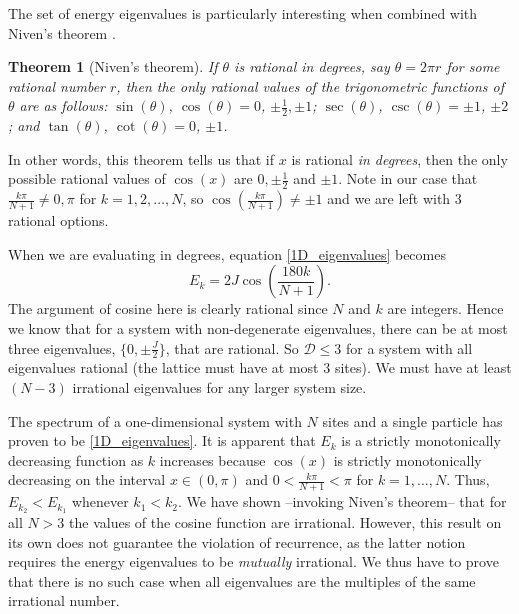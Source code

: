 \documentclass[prb, twocolumn, final]{revtex4-1}
\theoremstyle{plain}
\newtheorem*{theorem*}{Theorem}
\begin{document}
The set of energy eigenvalues is particularly interesting when combined with
Niven's theorem \cite{DoubleIvan}.

\begin{theorem*}[Niven's theorem]
    If $\theta$ is rational in degrees, say $\theta=2\pi r$ for some rational
    number $r$, then the only rational values of the trigonometric functions of
    $\theta$ are as follows: $\sin{\!(\theta)}$, $\cos{\!(\theta)} = 0$, $\pm
    \frac{1}{2}, \pm 1$; $\sec{\!(\theta)}$, $\csc{\!(\theta)} = \pm 1$, $\pm 2$;
    and $\tan{\!(\theta)}$, $\cot{\!(\theta)} = 0$, $\pm 1$.
\end{theorem*}
In other words, this theorem tells us that if $x$ is rational \textit{in
degrees}, then the only possible rational values of $\cos(x)$ are $0, \pm
\frac{1}{2}$ and $\pm 1$. Note in our case that $\frac{k\pi}{N+1}\neq 0, \pi$
for $k=1, 2, \dots, N$, so $\cos{\!(\frac{k\pi}{N+1})} \neq \pm 1$ and we are
left with $3$ rational options.

When we are evaluating in degrees, equation \eqref{1D_eigenvalues} becomes
\begin{equation}
    E_{k} = 2 J \cos{\!\left ( \frac{180k}{N+1} \right )}.
\end{equation}
The argument of cosine here is clearly rational since $N$ and $k$ are integers.
Hence we know that for a system with non-degenerate eigenvalues, there can be at
most three eigenvalues, $\lbrace 0, \pm \frac{J}{2} \rbrace$, that are rational.
So $\mathcal{D} \leq 3$ for a system with all eigenvalues rational (the lattice
must have at most 3 sites). We must have at least $(N-3)$ irrational eigenvalues
for any larger system size.

The spectrum of a one-dimensional system with $N$ sites and a single particle
has proven to be \eqref{1D_eigenvalues}. It is apparent that $E_{k}$ is a
strictly monotonically decreasing function as $k$ increases because $\cos(x)$ is
strictly monotonically decreasing on the interval $x\in(0,\pi)$ and $0 <
\frac{k\pi}{N+1} < \pi$ for $k=1,\dots,N$. Thus, $E_{k_{2}} < E_{k_{1}}$
whenever $k_{1} < k_{2}$. We have shown --invoking Niven's theorem-- that for
all $N>3$ the values of the cosine function are irrational. However, this result
on its own does not guarantee the violation of recurrence, as the latter notion
requires the energy eigenvalues to be {\emph{mutually}} irrational. We thus have
to prove that there is no such case when all eigenvalues are the multiples of
the same irrational number.
\end{document}
